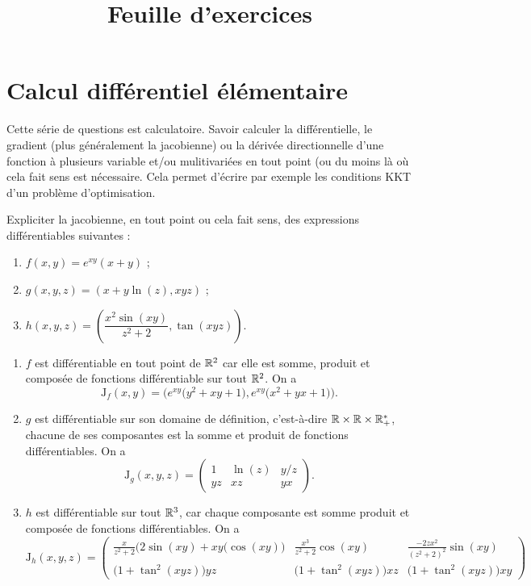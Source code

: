 \documentclass[11pt, a4paper]{article}
\title{%
  { \huge Feuille d'exercices}%
}
\author{}
\date{}
\begin{document}
\maketitle\thispagestyle{fancy}

\section{Calcul différentiel élémentaire}

Cette série de questions est calculatoire. Savoir calculer la
différentielle, le gradient (plus généralement la jacobienne) ou la
dérivée directionnelle d'une fonction à plusieurs variable et/ou
mulitivariées en tout point (ou du moins là où cela fait sens est
nécessaire. Cela permet d'écrire par exemple les conditions KKT d'un
problème d'optimisation.

\begin{question}
  Expliciter la jacobienne, en tout point ou cela fait sens, des
  expressions différentiables suivantes :
  \begin{enumerate}
  \item $f(x, y) = e^{xy}(x+y)$ ;
  \item $g(x, y, z) = (x + y\ln(z), xyz)$ ;
  \item $h(x, y, z) = \left(\dfrac{x^2\sin(xy)}{z^2 + 2}, \tan(xyz)\right)$.
  \end{enumerate}
\end{question}
\begin{solution}
  \begin{enumerate}
  \item $f$ est différentiable en tout point de $\mathbb{R}^2$ car elle est
    somme, produit et composée de fonctions différentiable sur tout
    $\mathbb{R}^2$. On a 
    \[
    \mathrm{J}_f(x, y) = \Big(e^{xy}\big(y^2+ xy + 1\big), e^{xy}\big(x^2+ yx + 1\big)\Big).
    \]
  \item $g$ est différentiable sur son domaine de définition,
    c'est-à-dire $\mathbb{R}\times \mathbb{R}\times \mathbb{R}_+^*$, chacune de ses
    composantes est la somme et produit de fonctions
    différentiables. On a
    \[ 
    \mathrm{J}_g(x, y, z) = \begin{pmatrix} 1 & \ln(z) & y/z \\ yz & xz & yx \end{pmatrix}.
    \]
  \item $h$ est différentiable sur tout $\mathbb{R}^3$, car chaque composante
    est somme produit et composée de fonctions différentiables. On a 
    \[
    \mathrm{J}_h(x, y, z) = 
    \begin{pmatrix} 
      \frac{x}{z^2 + 2}\big(2\sin(xy) + xy(\cos(xy)\big) 
      & \frac{x^3}{z^2+2}\cos(xy) 
      & \frac{-2zx^2}{(z^2+2)^2}\sin(xy) \\
      \big(1+\tan^2(xyz)\big)yz 
      & \big(1+\tan^2(xyz)\big)xz
      & \big(1+\tan^2(xyz)\big)xy
    \end{pmatrix}
    \]
  \end{enumerate}
\end{solution}
\end{document}
